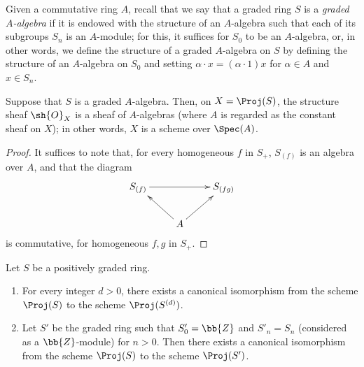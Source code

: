 \begin{env}[2.4.5]
\label{II.2.4.5}
Given a commutative ring $A$, recall that we say that a graded ring $S$ is a \emph{graded $A$-algebra} if it is endowed with the structure of an $A$-algebra such that each of its subgroups $S_n$ is an $A$-module;
for this, it suffices for $S_0$ to be
an $A$-algebra, or, in other words, we define the structure of a graded $A$-algebra on $S$ by defining the structure of an $A$-algebra on $S_0$ and setting $\alpha\cdot x=(\alpha\cdot1)x$ for $\alpha\in A$ and $x\in S_n$.
\end{env}

\begin{proposition}[2.4.6]
\label{II.2.4.6}
Suppose that $S$ is a graded $A$-algebra.
Then, on $X=\Proj(S)$, the structure sheaf $\sh{O}_X$ is a sheaf of $A$-algebras (where $A$ is regarded as the constant sheaf on $X$);
in other words, $X$ is a scheme over $\Spec(A)$.
\end{proposition}

\begin{proof}
It suffices to note that, for every homogeneous $f$ in $S_+$, $S_{(f)}$ is an algebra over $A$, and that the diagram
\[
  \xymatrix{
    S_{(f)} \ar[rr] && S_{(fg)}
  \\ & A \ar[ul] \ar[ur] &
  }
\]
is commutative, for homogeneous $f,g$ in $S_+$.
\end{proof}

\begin{proposition}[2.4.7]
\label{II.2.4.7}
Let $S$ be a positively graded ring.
\begin{enumerate}
  \item[{\rm(i)}] For every integer $d>0$, there exists a canonical isomorphism from the scheme $\Proj(S)$ to the scheme $\Proj(S^{(d)})$.
  \item[{\rm(ii)}] Let $S'$ be the graded ring such that $S'_0=\bb{Z}$ and $S'_n=S_n$ (considered as a $\bb{Z}$-module) for $n>0$.
    Then there exists a canonical isomorphism from the scheme $\Proj(S)$ to the scheme $\Proj(S')$.
\end{enumerate}
\end{proposition}

